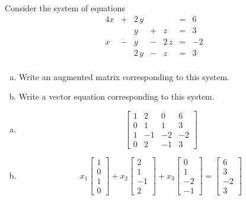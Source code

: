 
\begin{exerciseStatement}


 Consider the system of equations 
\begin{alignat*}{4} x &+& 2 \, y & &  &=& 6 \\ & & y &+& z &=& 3 \\x &-& y &-& 2 \, z &=& -2 \\ & & 2 \, y &-& z &=& 3 \\ \end{alignat*}
            


\begin{enumerate}[(a)]
\item  Write an augmented matrix corresponding to this system. 
\item  Write a vector equation corresponding to this system. 
\end{enumerate}
    
\end{exerciseStatement}
    
\begin{exerciseAnswer} 

\begin{enumerate}[(a)]
\item \[ \left[\begin{array}{ccc|c}
1 & 2 & 0 & 6 \\
0 & 1 & 1 & 3 \\
1 & -1 & -2 & -2 \\
0 & 2 & -1 & 3
\end{array}\right] \]
\item \[ x_{1} \left[\begin{array}{c}
1 \\
0 \\
1 \\
0
\end{array}\right] + x_{2} \left[\begin{array}{c}
2 \\
1 \\
-1 \\
2
\end{array}\right] + x_{3} \left[\begin{array}{c}
0 \\
1 \\
-2 \\
-1
\end{array}\right] = \left[\begin{array}{c}
6 \\
3 \\
-2 \\
3
\end{array}\right] \]
\end{enumerate}
    
\end{exerciseAnswer}
    
